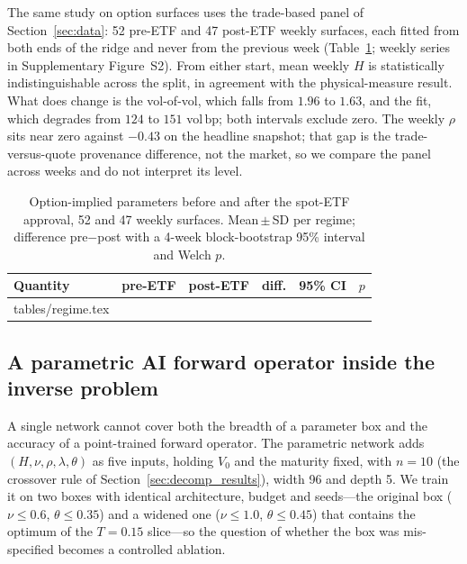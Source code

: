 \documentclass[preprint,12pt]{elsarticle}
\makeatletter
\newcommand{\bp}{\ensuremath{\,\mathrm{bp}}}
\newcommand{\revrows}[1]{\@@input tables/#1.tex }
\makeatother
\begin{document}
The same study on option surfaces uses the trade-based panel of
Section~\ref{sec:data}: 52 pre-ETF and 47 post-ETF weekly surfaces, each fitted
from both ends of the ridge and never from the previous week
(Table~\ref{tab:regime}; weekly series in Supplementary Figure~S2). From either
start, mean weekly $H$ is statistically indistinguishable across the split, in
agreement with the physical-measure result. What does change is the vol-of-vol,
which falls from $1.96$ to $1.63$, and the fit, which degrades from $124$ to $151$
vol\bp{}; both intervals exclude zero. The weekly $\rho$ sits near zero against
$-0.43$ on the headline snapshot; that gap is the trade-versus-quote provenance
difference, not the market, so we compare the panel across weeks and do not
interpret its level.
\begin{table}[!htbp]
\centering
\caption{Option-implied parameters before and after the spot-ETF approval, 52 and 47 weekly surfaces. Mean\,$\pm$\,SD per regime; difference pre$-$post with a 4-week block-bootstrap 95\% interval and Welch $p$.}
\label{tab:regime}
\footnotesize
\begin{tabular}{@{}l r r r r r@{}}
\toprule
Quantity & pre-ETF & post-ETF & diff. & 95\% CI & $p$ \\
\midrule
\revrows{regime}
\bottomrule
\end{tabular}
\end{table}
\fi

\subsection{A parametric AI forward operator inside the inverse problem}
\label{sec:parametric}
A single network cannot cover both the breadth of a parameter box and the
accuracy of a point-trained forward operator. The parametric network adds
$(H,\nu,\rho,\lambda,\theta)$ as five inputs, holding $V_0$ and the maturity
fixed, with $n{=}10$ (the crossover rule of Section~\ref{sec:decomp_results}),
width 96 and depth 5. We train it on two boxes with identical architecture,
budget and seeds---the original box ($\nu\le0.6$, $\theta\le0.35$) and a widened
one ($\nu\le1.0$, $\theta\le0.45$) that contains the optimum of the $T{=}0.15$
slice---so the question of whether the box was mis-specified becomes a
controlled ablation.
\end{document}
